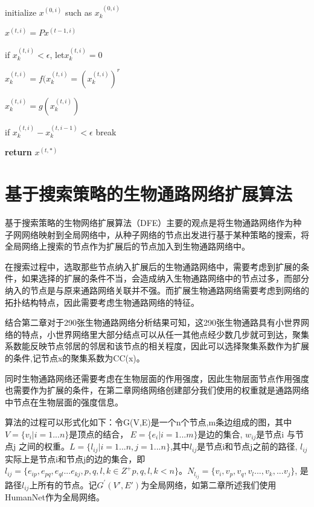\begin{algorithm}

%

{
	initialize $x^{(0, i)}$ such as $x^{\ \ ( 0,i)}_{k}$
    
	{
		$x^{(t,i)}=Px^{(t-1,i)}$

		if $x^{(t,i)}_{k} < \epsilon$, let$ x^{(t,i)}_{k}=0 $	

		 $x^{(t,i)}_{k}=f(x^{(t,i)}_{k}=(x^{(t,i)}_{k})^{r}$

		 $x^{(t,i)}_{k}=g(x^{(t,i)}_{k})$

		if  $x^{(t,i)}_{k} -  x^{(t,i-1)}_{k} < \epsilon$ break

 	}
}


\textbf{return} $x^{(t, *)}$
\end{algorithm}


\section{基于搜索策略的生物通路网络扩展算法}
基于搜索策略的生物网络扩展算法（DFE）主要的观点是将生物通路网络作为种子网网络映射到全局网络中，从种子网络的节点出发进行基于某种策略的搜索，将全局网络上搜索的节点作为扩展后的节点加入到生物通路网络中。

在搜索过程中，选取那些节点纳入扩展后的生物通路网络中，需要考虑到扩展的条件，如果选择的扩展的条件不当，会造成纳入生物通路网络中的节点过多，而部分纳入的节点是与原来通路网络关联并不强。而扩展生物通路网络需要考虑到网络的拓扑结构特点，因此需要考虑生物通路网络的特征。

结合第二章对于290张生物通路网络分析结果可知，这290张生物通路具有小世界网络的特点，小世界网络里大部分结点可以从任一其他点经少数几步就可到达，聚集系数能反映节点邻居的邻居和该节点的相关程度，因此可以选择聚集系数作为扩展的条件,记节点x的聚集系数为CC(x)。

同时生物通路网络还需要考虑在生物层面的作用强度，因此生物层面节点作用强度也需要作为扩展的条件，在第二章网络网络创建部分我们使用的权重就是通路网络中节点在生物层面的强度信息。

算法的过程可以形式化如下：令G(V,E)是一个n个节点,m条边组成的图，其中$V=\{v_{i} |i=1...n\}$是顶点的结合，$\ E=\{e_{i} |i=1...m\}$是边的集合, $w_{ij}$是节点i 与节点j 之间的权重。$L= \{l_{ij} | i=1...n, j=1...n \}$,其中$l_{ij}$是节点i和节点j之前的路径, $l_{ij}$实际上是节点i和节点j的边的集合，即$l_{ij}=\{e_{ip} , e_{pq}, e_{ql}...e_{kj}, p,q,l,k\in Z^{+} p,q,l,k < n \}$。$N_{l_{ij}}=\{v_{i}, v_{p}, v_{q}, v_{l}...,v_{k},...v_{j}\}$, 是路径$l_{ij}$上所有的节点。记$G^{'}(V', E')$为全局网络，如第二章所述我们使用HumanNet作为全局网络。

